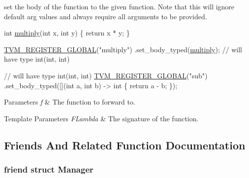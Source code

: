 set the body of the function to the given function. Note that this will ignore default arg values and always require all arguments to be provided. 


\begin{DoxyCode}
\textcolor{keywordtype}{int} \hyperlink{namespacetopi_ac3e9e4fa02b05853c13be69ec595aad7}{multiply}(\textcolor{keywordtype}{int} x, \textcolor{keywordtype}{int} y) \{
  \textcolor{keywordflow}{return} x * y;
\}

\hyperlink{registry_8h_a10f047b126505a3deda0b7f68718fa37}{TVM\_REGISTER\_GLOBAL}(\textcolor{stringliteral}{"multiply"})
.set\_body\_typed(\hyperlink{namespacetopi_ac3e9e4fa02b05853c13be69ec595aad7}{multiply}); \textcolor{comment}{// will have type int(int, int)}

\textcolor{comment}{// will have type int(int, int)}
\hyperlink{registry_8h_a10f047b126505a3deda0b7f68718fa37}{TVM\_REGISTER\_GLOBAL}(\textcolor{stringliteral}{"sub"})
.set\_body\_typed([](\textcolor{keywordtype}{int} a, \textcolor{keywordtype}{int} b) -> \textcolor{keywordtype}{int} \{ \textcolor{keywordflow}{return} a - b; \});
\end{DoxyCode}



\begin{DoxyParams}{Parameters}
{\em f} & The function to forward to. \\
\hline
\end{DoxyParams}

\begin{DoxyTemplParams}{Template Parameters}
{\em F\+Lambda} & The signature of the function. \\
\hline
\end{DoxyTemplParams}


\subsection{Friends And Related Function Documentation}
\subsubsection[{\texorpdfstring{Manager}{Manager}}]{\setlength{\rightskip}{0pt plus 5cm}friend struct Manager\hspace{0.3cm}{\ttfamily [friend]}}\hypertarget{classtvm_1_1runtime_1_1Registry_a1fd6b9bc3f72bb2b64e602de3982929d}{}\label{classtvm_1_1runtime_1_1Registry_a1fd6b9bc3f72bb2b64e602de3982929d}


